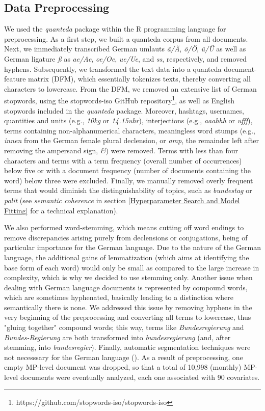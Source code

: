 \subsection{Data Preprocessing}
\label{Data Preprocessing}

We used the \textit{quanteda} package within the R programming language for preprocessing. As a first step, we built a quanteda corpus from all documents. Next, we immediately transcribed German umlauts \textit{ä/Ä}, \textit{ö/Ö}, \textit{ü/Ü} as well as German ligature \textit{ß} as \textit{ae/Ae}, \textit{oe/Oe}, \textit{ue/Ue}, and \textit{ss}, respectively, and removed hyphens. Subsequently, we transformed the text data into a quanteda document-feature matrix (DFM), which essentially tokenizes texts, thereby converting all characters to lowercase. From the DFM, we removed an extensive list of German stopwords, using the stopwords-iso GitHub repository\footnote{https://github.com/stopwords-iso/stopwords-iso}, as well as English stopwords included in the \textit{quanteda} package. Moreover, hashtags, usernames, quantities and units (e.g., \textit{10kg} or \textit{14.15uhr}), interjections (e.g., \textit{aaahhh} or \textit{ufff}), terms containing non-alphanumerical characters, meaningless word stumps (e.g., \textit{innen} from the German female plural declension, or \textit{amp}, the remainder left after removing the ampersand sign, \textit{\&}) were removed. Terms with less than four characters and terms with a term frequency (overall number of occurrences) below five or with a document frequency (number of documents containing the word) below three were excluded. Finally, we manually removed overly frequent terms that would diminish the distinguishability of topics, such as \textit{bundestag} or \textit{polit} (see \textit{semantic coherence} in section \ref{Hyperparameter Search and Model Fitting} for a technical explanation).

We also performed word-stemming, which means cutting off word endings to remove discrepancies arising purely from declensions or conjugations, being of particular importance for the German language. Due to the nature of the German language, the additional gains of lemmatization (which aims at identifying the base form of each word) would only be small as compared to the large increase in complexity, which is why we decided to use stemming only. Another issue when dealing with German language documents is represented by compound words, which are sometimes hyphenated, basically leading to a distinction where semantically there is none. We addressed this issue by removing hyphens in the very beginning of the preprocessing and converting all terms to lowercase, thus "gluing together" compound words; this way, terms like \textit{Bundesregierung} and \textit{Bundes-Regierung} are both transformed into \textit{bundesregierung} (and, after stemming, into \textit{bundesregier}). Finally, automatic segmentation techniques were not necesssary for the German language (\citealp{lucas2015computer}). As a result of preprocessing, one empty MP-level document was dropped, so that a total of 10,998 (monthly) MP-level documents were eventually analyzed, each one associated with 90 covariates.